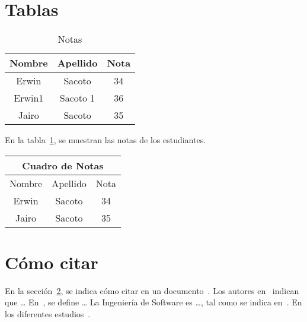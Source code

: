 \documentclass{article}
\theoremstyle{mytheoremstyle}
\theoremstyle{mytheoremstyle}
\theoremstyle{myproblemstyle}
\begin{document}
    \section{Tablas}
    \begin{table}[h]
        \centering
        \begin{tabular}{ccc}
            Nombre & Apellido & Nota \\ \hline \hline
            Erwin  & Sacoto   & 34   \\
            Erwin1 & Sacoto 1 & 36   \\
            Jairo  & Sacoto   & 35   \\ \hline \hline
        \end{tabular}
        \caption{Notas}
        \label{T1}
    \end{table}
    En la tabla~\ref{T1}, se muestran las notas de los estudiantes.
    \begin{table}[h]
        \centering
        \begin{tabular}{c|c|c}
            \multicolumn{3}{c}{Cuadro de Notas} \\ \hline
            Nombre & Apellido & Nota \\
            Erwin  & Sacoto   & 34   \\
            Jairo  & Sacoto   & 35   \\ \hline
        \end{tabular}
    \end{table}
    
    \section{Cómo citar}\label{sec:cita}
    En la sección~\ref{sec:cita}, se indica cómo citar en un documento~\cite{uno}.
    Los autores en~\cite{uno} indican que \ldots
    En~\cite{uno}, se define \ldots
    La Ingeniería de Software es \ldots, tal como se indica en~\cite{dos}.
    En los diferentes estudios~\cite{uno,dos}.
    
    
    
    
\end{document}
